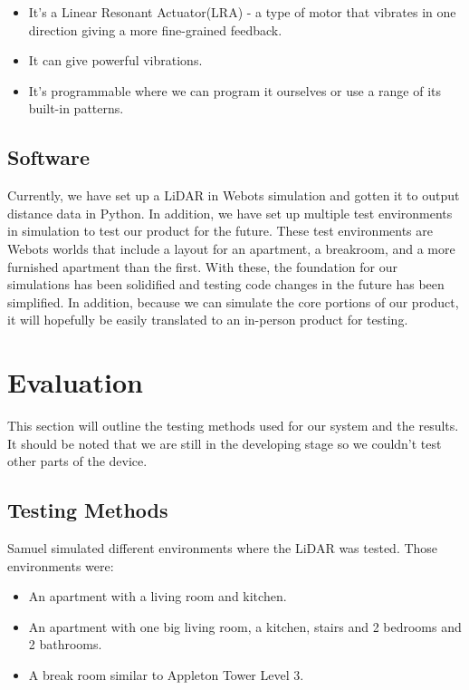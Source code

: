 \documentclass{article}
\begin{document}
\begin{itemize}
    \item It's a Linear Resonant Actuator(LRA) - a type of motor that vibrates in one direction giving a more fine-grained feedback.
    \item It can give powerful vibrations.
    \item It’s programmable where we can program it ourselves or use a range of its built-in patterns.

    
\end{itemize}

\subsection{ Software}
Currently, we have set up a LiDAR in Webots simulation and gotten it to output distance data in Python. In addition, we have set up multiple test environments in simulation to test our product for the future. These test environments are Webots worlds that include a layout for an apartment, a breakroom, and a more furnished apartment than the first. With these, the foundation for our simulations has been solidified and testing code changes in the future has been simplified. In addition, because we can simulate the core portions of our product, it will hopefully be easily translated to an in-person product for testing.




\section{Evaluation}
This section will outline the testing methods used for our system and the results. It should be noted that we are still in the developing stage so we couldn’t test other parts of the device.


\subsection{Testing Methods}

Samuel simulated different environments where the LiDAR was tested. Those environments were: 

\begin{itemize}
    \item An apartment with a living room and kitchen.
   
    \item An apartment with one big living room, a kitchen, stairs and 2 bedrooms and 2 bathrooms.
     \item A break room similar to Appleton Tower Level 3. 
    
\end{itemize}
\end{document}
